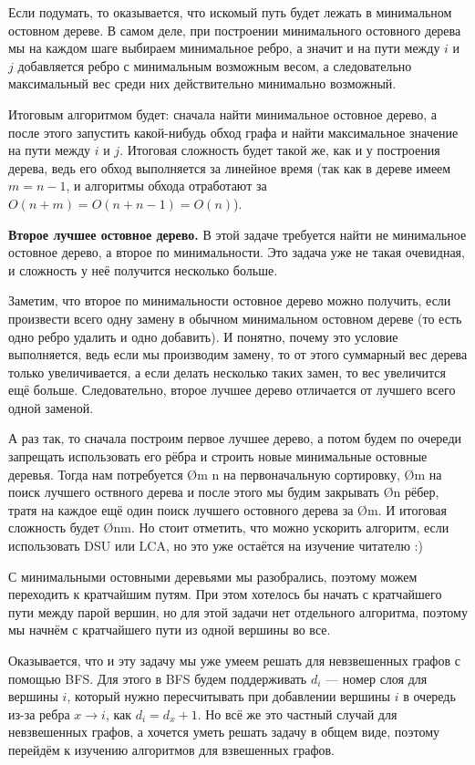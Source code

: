 Если подумать, то оказывается, что искомый путь будет лежать в минимальном остовном дереве. В самом деле, при построении минимального остовного дерева мы на каждом шаге выбираем минимальное ребро, а значит и на пути между $i$ и $j$ добавляется ребро с минимальным возможным весом, а следовательно максимальный вес среди них действительно минимально возможный.

Итоговым алгоритмом будет: сначала найти минимальное остовное дерево, а после этого запустить какой-нибудь обход графа и найти максимальное значение на пути между $i$ и $j$. Итоговая сложность будет такой же, как и у построения дерева, ведь его обход выполняется за линейное время (так как в дереве имеем $m = n - 1$, и алгоритмы обхода отработают за $O(n + m) = O(n + n - 1) = O(n)$).

\textbf{Второе лучшее остовное дерево.} В этой задаче требуется найти не минимальное остовное дерево, а второе по минимальности. Это задача уже не такая очевидная, и сложность у неё получится несколько больше.

Заметим, что второе по минимальности остовное дерево можно получить, если произвести всего одну замену в обычном минимальном остовном дереве (то есть одно ребро удалить и одно добавить). И понятно, почему это условие выполняется, ведь если мы производим замену, то от этого суммарный вес дерева только увеличивается, а если делать несколько таких замен, то вес увеличится ещё больше. Следовательно, второе лучшее дерево отличается от лучшего всего одной заменой.

А раз так, то сначала построим первое лучшее дерево, а потом будем по очереди запрещать использовать его рёбра и строить новые минимальные остовные деревья. Тогда нам потребуется \O{m \log n} на первоначальную сортировку, \O{m} на поиск лучшего оствного дерева и после этого мы будим закрывать \O{n} рёбер, тратя на каждое ещё один поиск лучшего остовного дерева за \O{m}. И итоговая сложность будет \O{nm}. Но стоит отметить, что можно ускорить алгоритм, если использовать DSU или LCA, но это уже остаётся на изучение читателю :)


С минимальными остовными деревьями мы разобрались, поэтому можем переходить к кратчайшим путям. При этом хотелось бы начать с кратчайшего пути между парой вершин, но для этой задачи нет отдельного алгоритма, поэтому мы начнём с кратчайшего пути из одной вершины во все.

Оказывается, что и эту задачу мы уже умеем решать для невзвешенных графов с помощью BFS. Для этого в BFS будем поддерживать $d_i$ — номер слоя для вершины $i$, который нужно пересчитывать при добавлении вершины $i$ в очередь из-за ребра $x \to i$, как $d_i = d_x + 1$. Но всё же это частный случай для невзвешенных графов, а хочется уметь решать задачу в общем виде, поэтому перейдём к изучению алгоритмов для взвешенных графов.

